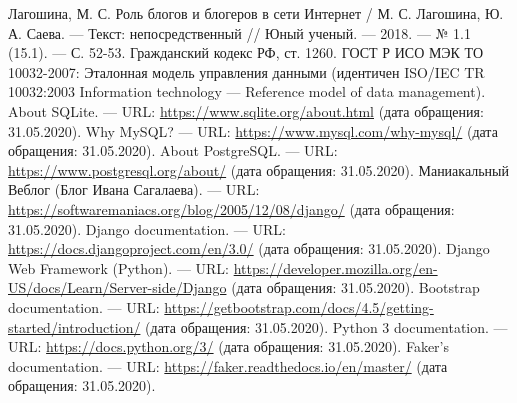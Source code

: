 
\begin{thebibliography}{3}
 Лагошина, М. С. Роль блогов и блогеров в сети Интернет / М. С. Лагошина, Ю. А. Саева. — Текст: непосредственный // Юный ученый. — 2018. — № 1.1 (15.1). — С. 52-53.
 Гражданский кодекс РФ, ст. 1260.
 ГОСТ Р ИСО МЭК ТО 10032-2007: Эталонная модель управления данными (идентичен ISO/IEC TR 10032:2003 Information technology — Reference model of data management).
 About SQLite. — URL: \url{https://www.sqlite.org/about.html} (дата обращения: 31.05.2020).
 Why MySQL? — URL: \url{https://www.mysql.com/why-mysql/} (дата обращения: 31.05.2020).
 About PostgreSQL. — URL: \url{https://www.postgresql.org/about/} (дата обращения: 31.05.2020).
 Маниакальный Веблог (Блог Ивана Сагалаева). — URL: \url{https://softwaremaniacs.org/blog/2005/12/08/django/} (дата обращения: 31.05.2020).
 Django documentation. — URL: \url{https://docs.djangoproject.com/en/3.0/} (дата обращения: 31.05.2020).
 Django Web Framework (Python). — URL: \url{https://developer.mozilla.org/en-US/docs/Learn/Server-side/Django} (дата обращения: 31.05.2020).
 Bootstrap documentation. — URL: \url{https://getbootstrap.com/docs/4.5/getting-started/introduction/} (дата обращения: 31.05.2020).
 Python 3 documentation. — URL: \url{https://docs.python.org/3/} (дата обращения: 31.05.2020).
 Faker's documentation. — URL: \url{https://faker.readthedocs.io/en/master/} (дата обращения: 31.05.2020).
\end{thebibliography}
